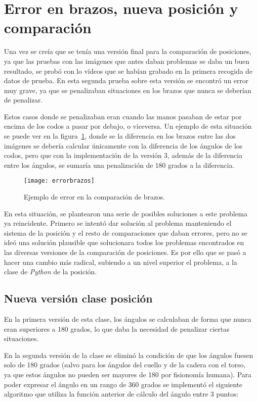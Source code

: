\section{Error en brazos, nueva posición y comparación}
Una vez se creía que se tenía una versión final para la comparación de posiciones, ya que las pruebas con las imágenes que antes daban problemas se daba un buen resultado, se probó con lo vídeos que se habían grabado en la primera recogida de datos de prueba. En esta segunda prueba sobre esta versión se encontró un error muy grave, ya que se penalizaban situaciones en los brazos que nunca se deberían de penalizar.

Estos casos donde se penalizaban eran cuando las manos pasaban de estar por encima de los codos a pasar por debajo, o viceversa. Un ejemplo de esta situación se puede ver en la figura~\ref{fig:errorbrazos}, donde se la diferencia en los brazos entre las dos imágenes se debería calcular únicamente con la diferencia de los ángulos de los codos, pero que con la implementación de la versión 3, además de la diferencia entre los ángulos, se sumaría una penalización de 180 grados a la diferencia.

\begin{figure}[h]
	\centering
	\texttt{[image: errorbrazos]}
	\caption{Ejemplo de error en la comparación de brazos.}
	\label{fig:errorbrazos}
\end{figure}

En esta situación, se plantearon una serie de posibles soluciones a este problema ya reincidente. Primero se intentó dar solución al problema manteniendo el sistema de la posición y el resto de comparaciones que daban errores, pero no se ideó una solución plausible que solucionara todos los problemas encontrados en las diversas versiones de la comparación de posiciones. Es por ello que se pasó a hacer una cambio más radical, subiendo a un nivel superior el problema, a la clase de \textit{Python} de la posición.

\subsection{Nueva versión clase posición}

En la primera versión de esta clase, los ángulos se calculaban de forma que nunca eran superiores a 180 grados, lo que daba la necesidad de penalizar ciertas situaciones.

En la segunda versión de la clase se eliminó la condición de que los ángulos fuesen solo de 180 grados (salvo para los ángulos del cuello y de la cadera con el torso, ya que estos ángulos no pueden ser mayores de 180 por fisionomía humana). Para poder expresar el ángulo en un rango de 360 grados se implementó el siguiente algoritmo que utiliza la función anterior de cálculo del ángulo entre 3 puntos:

